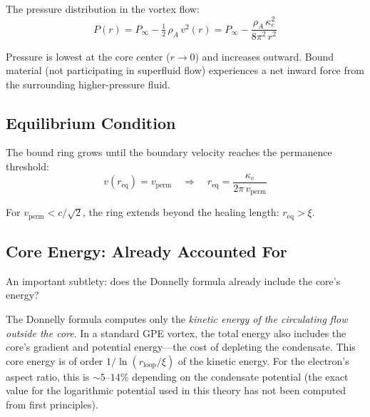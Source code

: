 \documentclass[12pt,letterpaper]{article}
\newcommand{\rhoa}{\rho_{\!A}}
\newcommand{\rloop}{r_{\mathrm{loop}}}
\begin{document}
The pressure distribution in the vortex flow:
%
\begin{equation}
  P(r) = P_\infty - \tfrac{1}{2}\,\rhoa\,v^2(r)
       = P_\infty - \frac{\rhoa\,\kappa_e^2}{8\pi^2\,r^2}
  \label{eq:bernoulli}
\end{equation}

Pressure is lowest at the core center ($r \to 0$) and increases outward.
Bound material (not participating in superfluid flow) experiences a net
inward force from the surrounding higher-pressure fluid.

\subsection{Equilibrium Condition}

The bound ring grows until the boundary velocity reaches the permanence
threshold:
%
\begin{equation}
  v(r_{\mathrm{eq}}) = v_{\mathrm{perm}}
  \quad\Longrightarrow\quad
  r_{\mathrm{eq}} = \frac{\kappa_e}{2\pi\,v_{\mathrm{perm}}}
  \label{eq:req}
\end{equation}

For $v_{\mathrm{perm}} < c/\sqrt{2}$, the ring extends beyond the healing
length: $r_{\mathrm{eq}} > \xi$.

\subsection{Core Energy: Already Accounted For}
\label{sec:core-energy}

An important subtlety: does the Donnelly formula already include the core's
energy?

The Donnelly formula computes only the \emph{kinetic energy of the
circulating flow outside the core}.  In a standard GPE vortex, the total
energy also includes the core's gradient and potential energy---the cost of
depleting the condensate.  This core energy is of order $1/\ln(\rloop/\xi)$
of the kinetic energy.  For the electron's aspect ratio, this is
$\sim\!5$--$14\%$ depending on the condensate potential (the exact value for
the logarithmic potential used in this theory has not been computed from first
principles).
\end{document}
